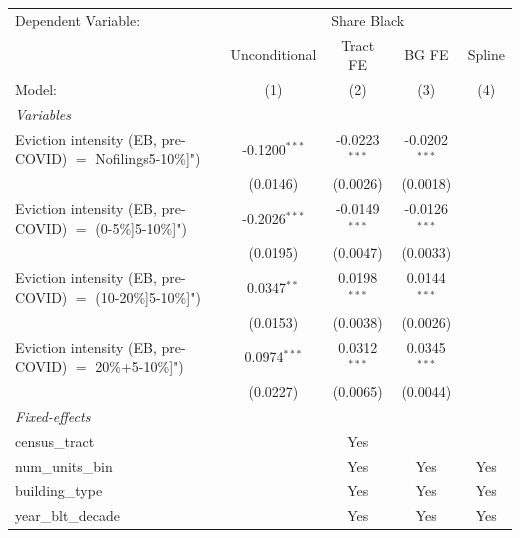 \begingroup
\centering
\begin{tabular}{lcccc}
   \tabularnewline \midrule \midrule
   Dependent Variable: & \multicolumn{4}{c}{Share Black}\\
                                                               & Unconditional   & Tract FE        & BG FE           & Spline \\   
   Model:                                                      & (1)             & (2)             & (3)             & (4)\\  
   \midrule
   \emph{Variables}\\
   Eviction intensity (EB, pre-COVID) $=$ Nofilings5-10\%]")   & -0.1200$^{***}$ & -0.0223$^{***}$ & -0.0202$^{***}$ &   \\   
                                                               & (0.0146)        & (0.0026)        & (0.0018)        &   \\   
   Eviction intensity (EB, pre-COVID) $=$ (0-5\%]5-10\%]")     & -0.2026$^{***}$ & -0.0149$^{***}$ & -0.0126$^{***}$ &   \\   
                                                               & (0.0195)        & (0.0047)        & (0.0033)        &   \\   
   Eviction intensity (EB, pre-COVID) $=$ (10-20\%]5-10\%]")   & 0.0347$^{**}$   & 0.0198$^{***}$  & 0.0144$^{***}$  &   \\   
                                                               & (0.0153)        & (0.0038)        & (0.0026)        &   \\   
   Eviction intensity (EB, pre-COVID) $=$ 20\%+5-10\%]")       & 0.0974$^{***}$  & 0.0312$^{***}$  & 0.0345$^{***}$  &   \\   
                                                               & (0.0227)        & (0.0065)        & (0.0044)        &   \\   
   \midrule
   \emph{Fixed-effects}\\
   census\_tract                                               &                 & Yes             &                 & \\  
   num\_units\_bin                                             &                 & Yes             & Yes             & Yes\\  
   building\_type                                              &                 & Yes             & Yes             & Yes\\  
   year\_blt\_decade                                           &                 & Yes             & Yes             & Yes\\  

\end{tabular}
